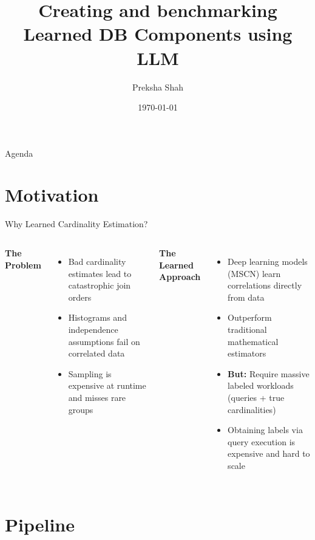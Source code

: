 \documentclass[aspectratio=169]{beamer}
\title{Creating and benchmarking Learned DB Components using LLM}
\author{Preksha Shah}
\institute[RPTU]{\\[0.3cm]Master's Thesis \\ FB Informatik}
\date{\today}
\begin{document}
	
	\begin{frame}[plain]
		\titlepage
	\end{frame}
	
	\begin{frame}{Agenda}
		\tableofcontents
	\end{frame}
	
	\section{Motivation}
	
	\begin{frame}{Why Learned Cardinality Estimation?}
		\begin{columns}[T]
			\textbf{The Problem}
			\begin{itemize}
				\item Bad cardinality estimates lead to catastrophic join orders
				\item Histograms and independence assumptions fail on correlated data
				\item Sampling is expensive at runtime and misses rare groups
			\end{itemize}
			
			\textbf{The Learned Approach}
			\begin{itemize}
				\item Deep learning models (MSCN) learn correlations directly from data
				\item Outperform traditional mathematical estimators
				\item \textbf{But:} Require massive labeled workloads (queries + true cardinalities)
				\item Obtaining labels via query execution is expensive and hard to scale
			\end{itemize}
		\end{columns}
	\end{frame}
	
	\section{Pipeline}
	
\end{document}

